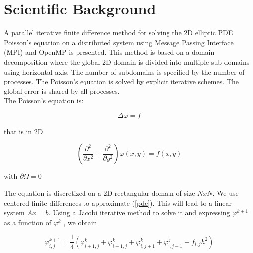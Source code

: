 \documentclass[11pt,a4paper]{article}
\begin{document}




\section{Scientific Background}

A parallel iterative finite difference method for solving the 2D elliptic PDE Poisson's equation on a distributed system using Message Passing Interface (MPI) and OpenMP is presented. This method is based on a domain decomposition where the global 2D domain is divided into multiple sub-domains using horizontal axis. The number of subdomains is specified by the number of processes. The Poisson's equation is solved by explicit iterative schemes. The global error is shared by all processes.
\\

The Poisson's equation is:

\begin{equation}
\Delta \varphi = f
\end{equation}

that is in 2D

\begin{equation}
\left( \frac{\partial^2}{\partial x^2} + \frac{\partial^2}{\partial y^2} \right) \varphi(x,y) = f(x,y)\label{pde}
\end{equation}

with $\partial \Omega = 0$

The equation is discretized on a 2D rectangular domain of size $NxN$. We use centered finite differences to approximate (\ref{pde}). This will lead to a linear system $Ax = b$. Using a Jacobi iterative method to solve it and expressing $\varphi^{k+1}$ as a function of $\varphi^k$ , we obtain

\begin{equation}
\varphi_{i,j}^{k+1} = \frac{1}{4} \left( \varphi_{i+1,j}^{k} + \varphi_{i-1,j}^{k} + \varphi_{i,j+1}^{k} + \varphi_{i,j-1}^{k} -f_{i,j} h^2 \right)
\end{equation}
\end{document}
